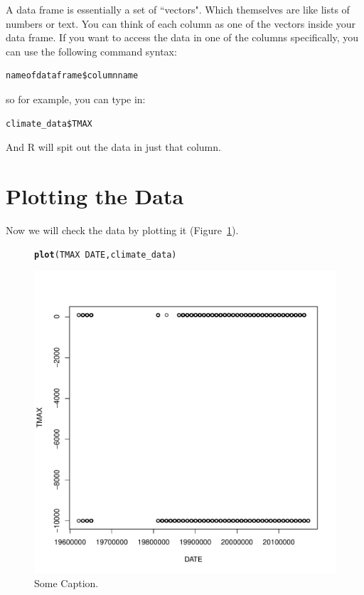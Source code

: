 \documentclass{article}\usepackage[]{graphicx}\usepackage[]{color}
\makeatletter
\def\maxwidth{ %
  \ifdim\Gin@nat@width>\linewidth
    \linewidth
  \else
    \Gin@nat@width
  \fi
}
\newcommand{\hlopt}[1]{\textcolor[rgb]{0,0,0}{#1}}%
\newcommand{\hlstd}[1]{\textcolor[rgb]{0.345,0.345,0.345}{#1}}%
\newcommand{\hlkwd}[1]{\textcolor[rgb]{0.737,0.353,0.396}{\textbf{#1}}}%
\newenvironment{kframe}{%
 \def\at@end@of@kframe{}%
 \ifinner\ifhmode%
  \def\at@end@of@kframe{\end{minipage}}%
  \begin{minipage}{\columnwidth}%
 \fi\fi%
 \def\FrameCommand##1{\hskip\@totalleftmargin \hskip-\fboxsep
 \colorbox{shadecolor}{##1}\hskip-\fboxsep
     \hskip-\linewidth \hskip-\@totalleftmargin \hskip\columnwidth}%
 \MakeFramed {\advance\hsize-\width
   \@totalleftmargin\z@ \linewidth\hsize
   \@setminipage}}%
 {\par\unskip\endMakeFramed%
 \at@end@of@kframe}
\newenvironment{knitrout}{}{} %
\makeatother
\begin{document}
A data frame is essentially a set of ``vectors". Which themselves are like lists of numbers or text. You can think of each column as one of the vectors inside your data frame. If you want to access the data in one of the columns specifically, you can use the following command syntax:

\begin{verbatim}
nameofdataframe$columnname
\end{verbatim}

so for example, you can type in:

\begin{verbatim}
climate_data$TMAX
\end{verbatim}

And R will spit out the data in just that column. 

\section{Plotting the Data}

Now we will check the data by plotting it (Figure~\ref{fig:plotmissing}).

\begin{figure}
\begin{knitrout}
\color{fgcolor}\begin{kframe}
\begin{alltt}
\hlkwd{plot}\hlstd{(TMAX}\hlopt{~}\hlstd{DATE, climate_data)}
\end{alltt}
\end{kframe}
\includegraphics[width=\maxwidth]{figure/unnamed-chunk-5-1} 

\end{knitrout}
\caption{Some Caption.}
\label{fig:plotmissing}
\end{figure}
\end{document}
